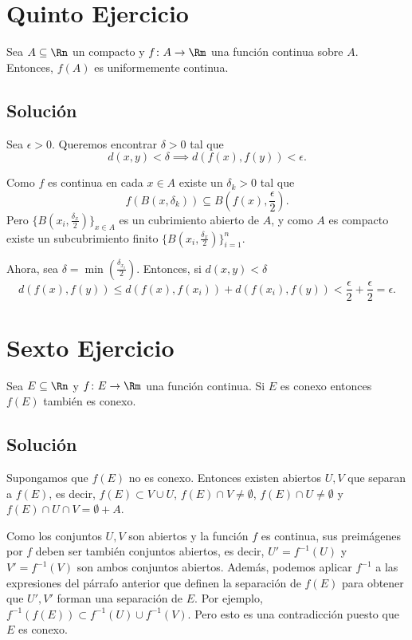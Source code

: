 \documentclass{scrartcl}
\begin{document}
\section{Quinto Ejercicio}

Sea \(A\subseteq\Rn\) un compacto y \(f\colon A\to\Rm\)
una función continua sobre \(A\). Entonces, \(f(A)\) es
uniformemente continua.

\subsection{Solución}

Sea \(\epsilon>0\). Queremos encontrar \(\delta>0\)
tal que
\[d(x,y)<\delta\implies d(f(x),f(y)) < \epsilon.\]

Como \(f\) es continua en cada \(x\in A\) existe un
\(\delta_k>0\) tal que
\[f(B(x,\delta_k))\subseteq B(f(x),\frac{\epsilon}{2}).\]
Pero \(\{B(x_i,\frac{\delta_x}{2})\}_{x\in A}\) es un cubrimiento
abierto de \(A\), y como \(A\) es compacto existe un subcubrimiento
finito \(\{ B(x_i,\frac{\delta_x}{2})\}_{i=1}^n\).

Ahora, sea \(\delta = \min(\frac{\delta_{x_i}}{2})\).
Entonces, si \(d(x,y) < \delta\)
\[d(f(x),f(y))\leq d(f(x),f(x_i)) + d(f(x_i),f(y)) < \frac{\epsilon}{2} + \frac{\epsilon}{2} = \epsilon.\]

\section{Sexto Ejercicio}

Sea \(E\subseteq\Rn\) y \(f \colon E\to\Rm\) una función continua.
Si \(E\) es conexo entonces \(f(E)\) también es conexo.

\subsection{Solución}

Supongamos que \(f(E)\) no es conexo. Entonces existen
abiertos \(U,V\) que separan a \(f(E)\), es decir,
\(f(E)\subset V\cup U\), \(f(E)\cap V\neq\emptyset\),
\(f(E)\cap U\neq\emptyset\) y \(f(E)\cap U\cap V = \emptyset + A\).

Como los conjuntos \(U,V\) son abiertos y la función
\(f\) es continua, sus preimágenes por \(f\) deben ser
también conjuntos abiertos, es decir, \(U'=f^{-1}(U)\) y \(V'=f^{-1}(V)\)
son ambos conjuntos abiertos.
Además, podemos aplicar \(f^{-1}\) a las expresiones
del párrafo anterior que definen la separación de \(f(E)\)
para obtener que \(U',V'\) forman una separación de \(E\). Por ejemplo,
\(f^{-1}(f(E))\subset f^{-1}(U)\cup f^{-1}(V)\).
Pero esto es una contradicción puesto que \(E\) es conexo.


\end{document}
